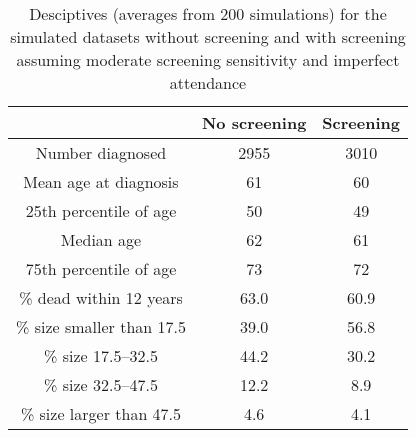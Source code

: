 \begin{table}
\centering
\caption{Desciptives (averages  from  200  simulations) for the simulated datasets without screening and with screening assuming moderate screening sensitivity and imperfect attendance}
\label{tab:des}
\begin{threeparttable}
\scalebox{1} {
\begin{tabular}{ccc}
\toprule
& No screening & Screening    \\
\midrule
Number diagnosed &  2955 & 3010  \\
Mean age at diagnosis &  61 & 60  \\
25th percentile of age &  50 & 49  \\
Median age &  62 & 61  \\
75th percentile of age &  73 & 72  \\
\% dead within 12 years &  63.0 & 60.9  \\
\% size smaller than 17.5 &  39.0 & 56.8 \\
\% size 17.5--32.5 &  44.2 & 30.2 \\
\% size 32.5--47.5 &  12.2 & 8.9 \\
\% size larger than 47.5 &  4.6 & 4.1 \\
\bottomrule
\end{tabular}}
\end{threeparttable}
\end{table}